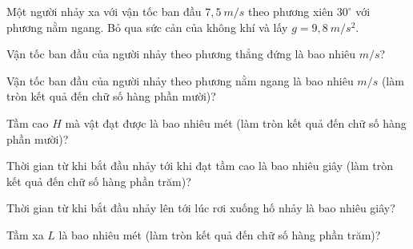
\begin{vidu}
Một người nhảy xa với vận tốc ban đầu $7,5\ m/s$ theo phương xiên $30^\circ$ với phương nằm ngang. Bỏ qua sức cản của không khí và lấy $g=9,8\ m/s^2$.
\begin{vdc} 
Vận tốc ban đầu của người nhảy theo phương thẳng đứng là bao nhiêu $m/s$?
\end{vdc}

\begin{vdc} 
Vận tốc ban đầu của người nhảy theo phương nằm ngang là bao nhiêu $m/s$ (làm tròn kết quả đến chữ số hàng phần mười)?
\end{vdc}

\begin{vdc} 
Tầm cao $H$ mà vật đạt được là bao nhiêu mét (làm tròn kết quả đến chữ số hàng phần mười)?
\end{vdc}

\begin{vdc} 
Thời gian từ khi bắt đầu nhảy tới khi đạt tầm cao là bao nhiêu giây (làm tròn kết quả đến chữ số hàng phần trăm)?
\end{vdc}

\begin{vdc} 
Thời gian từ khi bắt đầu nhảy lên tới lúc rơi xuống hố nhảy là bao nhiêu giây?
\end{vdc}

\begin{vdc} 
Tầm xa $L$ là bao nhiêu mét (làm tròn kết quả đến chữ số hàng phần trăm)?
\end{vdc}

\end{vidu}











